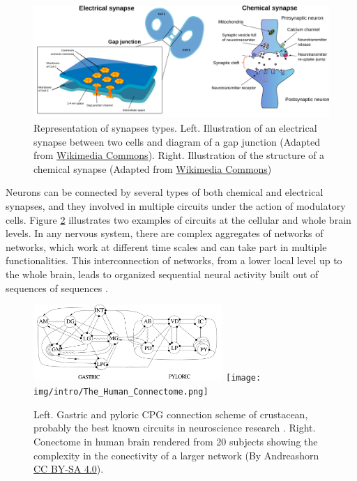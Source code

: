 \begin{figure}[hbt!]
    \centering
    \includegraphics[width=\linewidth]{img/intro/synapses.pdf}
    \caption{Representation of synapses types. Left. Illustration of an electrical synapse between two cells and diagram of a gap junction (Adapted from \href{https://commons.wikimedia.org/wiki/File:Gap_cell_junction-en.svg}{Wikimedia Commons}). Right. Illustration of the structure of a chemical synapse (Adapted from \href{https://commons.wikimedia.org/wiki/File:Synapse_diag1.svg}{Wikimedia Commons})}
    \label{fig:synapse-types}
\end{figure}

Neurons can be connected by several types of both chemical and electrical synapses, and they involved in multiple circuits under the action of modulatory cells. Figure \ref{fig:neural circuits} illustrates two examples of circuits at the cellular and whole brain levels. In any nervous system, there are complex aggregates of networks of networks, which work at different time scales and can take part in multiple functionalities. This interconnection of networks, from a lower local level up to the whole brain, leads to organized sequential neural activity built out of sequences of sequences \parencite{rabinovich_sequential_2020}.


\begin{figure}[hbt!]
    \centering
    \includegraphics[width=0.64\textwidth]{img/intro/cpg diagram.png}
    \texttt{[image: img/intro/The\_Human\_Connectome.png]}
    \caption{Left. Gastric and pyloric CPG connection scheme of crustacean, probably the best known circuits in neuroscience research \parencite{huerta_topology_2001}. Right. Conectome in human brain rendered from 20 subjects showing the complexity in the conectivity of a larger network (By Andreashorn \href{https://commons.wikimedia.org/w/index.php?curid=41581320}{CC BY-SA 4.0}).}
    \label{fig:neural circuits}
\end{figure}

